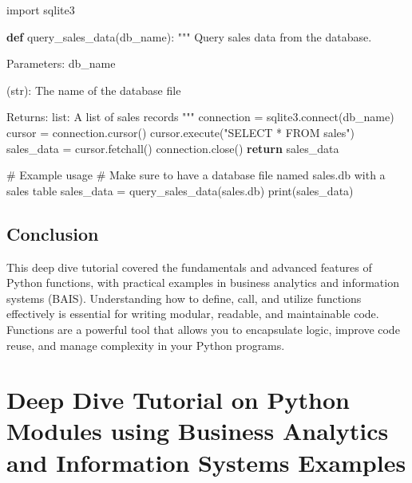 \documentclass[
  letterpaper,
  DIV=11,
  numbers=noendperiod]{scrreprt}
\newenvironment{Shaded}{\begin{snugshade}}{\end{snugshade}}
\newcommand{\BuiltInTok}[1]{\textcolor[rgb]{0.00,0.23,0.31}{#1}}
\newcommand{\CommentTok}[1]{\textcolor[rgb]{0.37,0.37,0.37}{#1}}
\newcommand{\ControlFlowTok}[1]{\textcolor[rgb]{0.00,0.23,0.31}{\textbf{#1}}}
\newcommand{\ExtensionTok}[1]{\textcolor[rgb]{0.00,0.23,0.31}{#1}}
\newcommand{\ImportTok}[1]{\textcolor[rgb]{0.00,0.46,0.62}{#1}}
\newcommand{\KeywordTok}[1]{\textcolor[rgb]{0.00,0.23,0.31}{\textbf{#1}}}
\newcommand{\NormalTok}[1]{\textcolor[rgb]{0.00,0.23,0.31}{#1}}
\newcommand{\OperatorTok}[1]{\textcolor[rgb]{0.37,0.37,0.37}{#1}}
\newcommand{\StringTok}[1]{\textcolor[rgb]{0.13,0.47,0.30}{#1}}
\begin{document}
\begin{Shaded}
\begin{Highlighting}[]
\ImportTok{import}\NormalTok{ sqlite3}

\KeywordTok{def}\NormalTok{ query\_sales\_data(db\_name):}
    \CommentTok{"""}
\CommentTok{    Query sales data from the database.}

\CommentTok{    Parameters:}
\CommentTok{    db\_name}

\CommentTok{ (str): The name of the database file}

\CommentTok{    Returns:}
\CommentTok{    list: A list of sales records}
\CommentTok{    """}
\NormalTok{    connection }\OperatorTok{=}\NormalTok{ sqlite3.}\ExtensionTok{connect}\NormalTok{(db\_name)}
\NormalTok{    cursor }\OperatorTok{=}\NormalTok{ connection.cursor()}
\NormalTok{    cursor.execute(}\StringTok{"SELECT * FROM sales"}\NormalTok{)}
\NormalTok{    sales\_data }\OperatorTok{=}\NormalTok{ cursor.fetchall()}
\NormalTok{    connection.close()}
    \ControlFlowTok{return}\NormalTok{ sales\_data}

\CommentTok{\# Example usage}
\CommentTok{\# Make sure to have a database file named \textquotesingle{}sales.db\textquotesingle{} with a \textquotesingle{}sales\textquotesingle{} table}
\NormalTok{sales\_data }\OperatorTok{=}\NormalTok{ query\_sales\_data(}\StringTok{\textquotesingle{}sales.db\textquotesingle{}}\NormalTok{)}
\BuiltInTok{print}\NormalTok{(sales\_data)}
\end{Highlighting}
\end{Shaded}

\section{Conclusion}\label{conclusion-6}

This deep dive tutorial covered the fundamentals and advanced features
of Python functions, with practical examples in business analytics and
information systems (BAIS). Understanding how to define, call, and
utilize functions effectively is essential for writing modular,
readable, and maintainable code. Functions are a powerful tool that
allows you to encapsulate logic, improve code reuse, and manage
complexity in your Python programs.


\chapter{Deep Dive Tutorial on Python Modules using Business Analytics
and Information Systems
Examples}\label{deep-dive-tutorial-on-python-modules-using-business-analytics-and-information-systems-examples}
\end{document}

